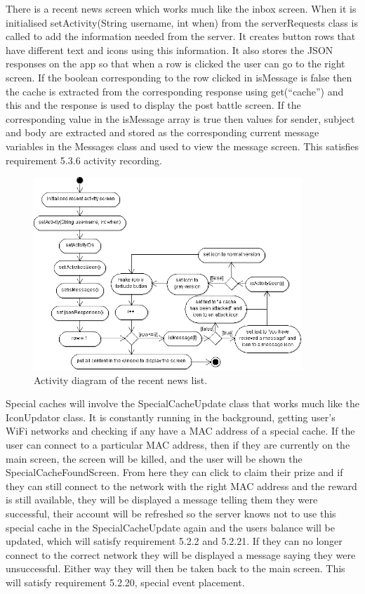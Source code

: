There is a recent news screen which works much like the inbox screen. When it is initialised setActivity(String username, int when) from the serverRequests class is called to add the information needed from the server. It creates button rows that have different text and icons using this information. It also stores the JSON responses on the app so that when a row is clicked the user can go to the right screen. If the boolean corresponding to the row clicked in isMessage is false then the cache is extracted from the corresponding response using get(``cache'') and this and the response is used to display the post battle screen. If the corresponding value in the isMessage array is true then values for sender, subject and body are extracted and stored as the corresponding current message variables in the Messages class and used to view the message screen. This satisfies requirement 5.3.6 activity recording.

\begin{figure}
    \centering
    \includegraphics[width=0.9\textwidth]{images/activity/recentActivity}
    \caption{Activity diagram of the recent news list.}
\end{figure}

Special caches will involve the SpecialCacheUpdate class that works much like the IconUpdator class. It is constantly running in the background, getting user's WiFi networks and checking if any have a MAC address of a special cache. If the user can connect to a particular MAC address, then if they are currently on the main screen, the screen will be killed, and the user will be shown the SpecialCacheFoundScreen. From here they can click to claim their prize and if they can still connect to the network with the right MAC address and the reward is still available, they will be displayed a message telling them they were successful, their account will be refreshed so the server knows not to use this special cache in the SpecialCacheUpdate again and the users balance will be updated, which will satisfy requirement 5.2.2 and 5.2.21. If they can no longer connect to the correct network they will be displayed a message saying they were unsuccessful. Either way they will then be taken back to the main screen. This will satisfy requirement 5.2.20, special event placement.

